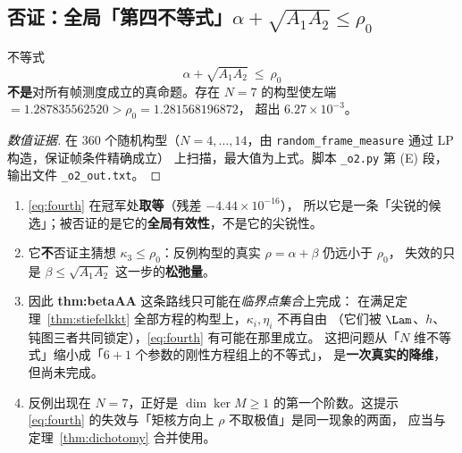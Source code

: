 \subsection{否证：全局「第四不等式」$\alpha+\sqrt{A_1A_2}\le\rho_0$}\label{sec:r16:refute}

\begin{proposition}[否证]\label{prop:fourthfalse}
不等式
\begin{equation}\label{eq:fourth}
\alpha+\sqrt{A_1A_2}\ \le\ \rho_0
\end{equation}
\textbf{不是}对所有帧测度成立的真命题。存在 $N=7$ 的构型使左端 $=1.287835562520>\rho_0=1.281568196872$，
超出 $6.27\times10^{-3}$。
\end{proposition}

\begin{proof}[数值证据]
在 $360$ 个随机构型（$N=4,\dots,14$，由 \texttt{random\_frame\_measure} 通过 LP 构造，保证帧条件精确成立）
上扫描，最大值为上式。脚本 \texttt{\_o2.py} 第 (E) 段，输出文件 \texttt{\_o2\_out.txt}。
\end{proof}

\begin{remark}\label{rmk:fourthmean}
\begin{enumerate}\itemsep2pt
\item \eqref{eq:fourth} 在冠军处\textbf{取等}（残差 $-4.44\times10^{-16}$），
所以它是一条「尖锐的候选」；被否证的是它的\textbf{全局有效性}，不是它的尖锐性。
\item 它\textbf{不}否证主猜想 $\kappa_3\le\rho_0$：反例构型的真实 $\rho=\alpha+\beta$ 仍远小于 $\rho_0$，
失效的只是 $\beta\le\sqrt{A_1A_2}$ 这一步的\textbf{松弛量}。
\item 因此 \textbf{thm:betaAA} 这条路线只可能在\emph{临界点集合}上完成：
在满足定理~\ref{thm:stiefelkkt} 全部方程的构型上，$\kappa_i,\eta_i$ 不再自由
（它们被 $\Lam$、$h$、钝图三者共同锁定），\eqref{eq:fourth} 有可能在那里成立。
这把问题从「$N$ 维不等式」缩小成「$6+1$ 个参数的刚性方程组上的不等式」，
是\textbf{一次真实的降维}，但尚未完成。
\item 反例出现在 $N=7$，正好是 $\dim\ker M\ge1$ 的第一个阶数。这提示
\eqref{eq:fourth} 的失效与「矩核方向上 $\rho$ 不取极值」是同一现象的两面，
应当与定理~\ref{thm:dichotomy} 合并使用。
\end{enumerate}
\end{remark}

